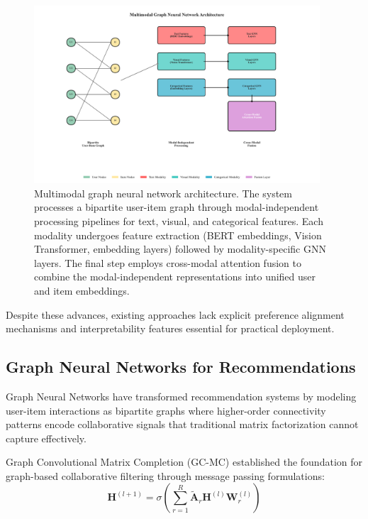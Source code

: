 \documentclass[pdflatex,sn-mathphys-num]{sn-jnl}%
\theoremstyle{thmstyleone}%
\theoremstyle{thmstyletwo}%
\theoremstyle{thmstylethree}%
\begin{document}
\begin{figure}[H]
\centering
\includegraphics[width=0.95\textwidth]{figures/multimodal_gnn_structure_new.pdf}
\caption{Multimodal graph neural network architecture. The system processes a bipartite user-item graph through modal-independent processing pipelines for text, visual, and categorical features. Each modality undergoes feature extraction (BERT embeddings, Vision Transformer, embedding layers) followed by modality-specific GNN layers. The final step employs cross-modal attention fusion to combine the modal-independent representations into unified user and item embeddings.}
\label{fig:multimodal_gnn_structure}
\end{figure}

Despite these advances, existing approaches lack explicit preference alignment mechanisms and interpretability features essential for practical deployment.

\subsection{Graph Neural Networks for Recommendations}

Graph Neural Networks have transformed recommendation systems by modeling user-item interactions as bipartite graphs where higher-order connectivity patterns encode collaborative signals that traditional matrix factorization cannot capture effectively.

Graph Convolutional Matrix Completion (GC-MC) \cite{berg2017graph} established the foundation for graph-based collaborative filtering through message passing formulations:
\begin{equation}
\mathbf{H}^{(l+1)} = \sigma(\sum_{r=1}^{R} \tilde{\mathbf{A}}_r \mathbf{H}^{(l)} \mathbf{W}_r^{(l)})
\end{equation}
\end{document}
